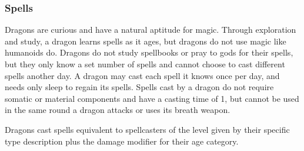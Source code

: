 \begin{multicols}{2}
\subsubsection*{Spells}

Dragons are curious and have a natural aptitude for magic. Through exploration and study, a dragon learns spells as it ages, but dragons do not use magic like humanoids do. Dragons do not study spellbooks or pray to gods for their spells, but they only know a set number of spells and cannot choose to cast different spells another day. A dragon may cast each spell it knows once per day, and needs only sleep to regain its spells. Spells cast by a dragon do not require somatic or material components and have a casting time of 1, but cannot be used in the same round a dragon attacks or uses its breath weapon.

Dragons cast spells equivalent to spellcasters of the level given by their specific type description plus the damage modifier for their age category.

\end{multicols}

\pagebreak

